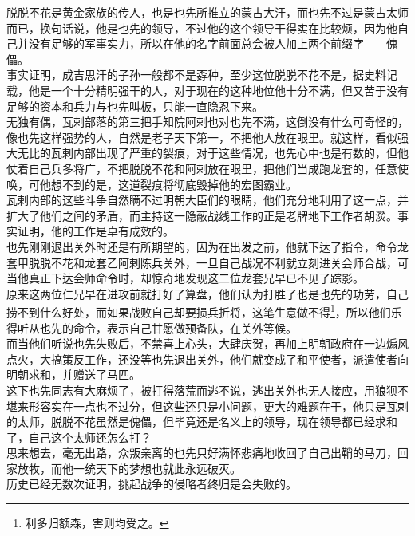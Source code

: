 \begin{multicols}{\theparacolNo}
脱脱不花是黄金家族的传人，也是也先所推立的蒙古大汗，而也先不过是蒙古太师而已，换句话说，他是也先的领导，不过他的这个领导干得实在比较烦，因为他自己并没有足够的军事实力，所以在他的名字前面总会被人加上两个前缀字——傀儡。\\

事实证明，成吉思汗的子孙一般都不是孬种，至少这位脱脱不花不是，据史料记载，他是一个十分精明强干的人，对于现在的这种地位他十分不满，但又苦于没有足够的资本和兵力与也先叫板，只能一直隐忍下来。\\

无独有偶，瓦剌部落的第三把手知院阿剌也对也先不满，这倒没有什么可奇怪的，像也先这样强势的人，自然是老子天下第一，不把他人放在眼里。就这样，看似强大无比的瓦剌内部出现了严重的裂痕，对于这些情况，也先心中也是有数的，但他仗着自己兵多将广，不把脱脱不花和阿剌放在眼里，把他们当成跑龙套的，任意使唤，可他想不到的是，这道裂痕将彻底毁掉他的宏图霸业。\\

瓦剌内部的这些斗争自然瞒不过明朝大臣们的眼睛，他们充分地利用了这一点，并扩大了他们之间的矛盾，而主持这一隐蔽战线工作的正是老牌地下工作者胡濙。事实证明，他的工作是卓有成效的。\\

也先刚刚退出关外时还是有所期望的，因为在出发之前，他就下达了指令，命令龙套甲脱脱不花和龙套乙阿剌陈兵关外，一旦自己战况不利就立刻进关会师合战，可当他真正下达会师命令时，却惊奇地发现这二位龙套兄早已不见了踪影。\\

原来这两位仁兄早在进攻前就打好了算盘，他们认为打胜了也是也先的功劳，自己捞不到什么好处，而如果战败自己却要损兵折将，这笔生意做不得\footnote{利多归额森，害则均受之。}，所以他们乐得听从也先的命令，表示自己甘愿做预备队，在关外等候。\\

而当他们听说也先失败后，不禁喜上心头，大肆庆贺，再加上明朝政府在一边煽风点火，大搞策反工作，还没等也先退出关外，他们就变成了和平使者，派遣使者向明朝求和，并赠送了马匹。\\

这下也先同志有大麻烦了，被打得落荒而逃不说，逃出关外也无人接应，用狼狈不堪来形容实在一点也不过分，但这些还只是小问题，更大的难题在于，他只是瓦剌的太师，脱脱不花虽然是傀儡，但毕竟还是名义上的领导，现在领导都已经求和了，自己这个太师还怎么打？\\

思来想去，毫无出路，众叛亲离的也先只好满怀悲痛地收回了自己出鞘的马刀，回家放牧，而他一统天下的梦想也就此永远破灭。\\

历史已经无数次证明，挑起战争的侵略者终归是会失败的。\\
\ifnum{}
	\end{multicols}
\fi
\newpage
